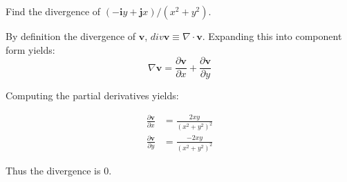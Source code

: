 Find the divergence of $\left(-\boldsymbol{i}y+\boldsymbol{j}x\right)/\left(x^2+y^2\right)$.

By definition the divergence of $\boldsymbol{v}$, $div \boldsymbol{v}\equiv \nabla \cdot \boldsymbol{v}$. Expanding this into component form yields:
\begin{equation}
	\nabla \boldsymbol{v}=\frac{\partial \boldsymbol{v}}{\partial x}+\frac{\partial \boldsymbol{v}}{\partial y}
\end{equation}

Computing the partial derivatives yields:

	\begin{align*}
		\frac{\partial \boldsymbol{v}}{\partial x}&=\frac{2xy}{\left(x^2+y^2\right)^2} \\
		\frac{\partial \boldsymbol{v}}{\partial y}&=\frac{-2xy}{\left(x^2+y^2\right)^2}
	\end{align*}

Thus the divergence is $0$.